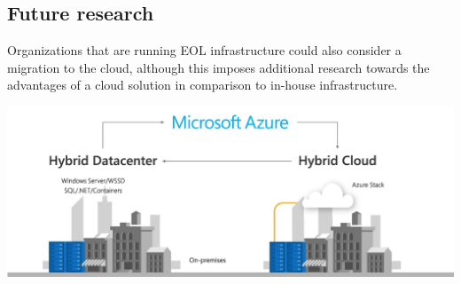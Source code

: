 \documentclass[a0,portrait]{a0poster}
\begin{document}
\begin{multicols}{2}
\section*{Future research}
\color{black}
Organizations that are running EOL infrastructure could also consider a migration to the cloud, although this imposes additional research towards the advantages of a cloud solution in comparison to in-house infrastructure.
\begin{center}
    \includegraphics[width=1.0\linewidth]{../bachproef/img/Toekomstvisie/Azure1.png}
\end{center}
\end{multicols}
\end{document}
